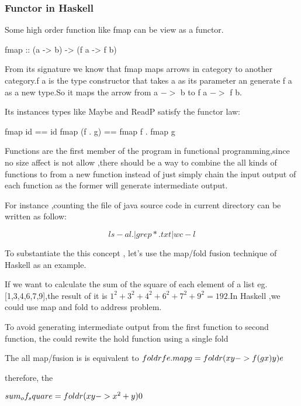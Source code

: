 \subsubsection*{Functor in Haskell}
Some high order function like fmap can be view as a functor.
\begin{hcode}
fmap :: (a -> b) -> (f a -> f b)
\end{hcode}
From its signature we know that fmap maps arrows in category to another category.f a is the type constructor that takes a as its parameter an generate f a as a new type.So it maps the arrow from a $->$ b to f a $->$ f b.

Its instances types like Maybe and ReadP satisfy the functor law:
\begin{hcode}
fmap id  ==  id
fmap (f . g)  ==  fmap f . fmap g
\end{hcode}

Functions are the first member of the program in functional programming,since no size affect is not allow ,there should be a way to combine the all kinds of functions to from a new function instead of just simply chain the input output of each function as the former will generate intermediate output.


For instance ,counting the file of java source code in current directory can be written as follow:


	$$ ls-al . | grep *.txt| wc -l $$ 
	
	
To substantiate the this concept , let's use the map/fold fusion technique of Haskell as an example.

If we want to calculate the sum of the square of each element of a list eg. [1,3,4,6,7,9],the result of it is  $ 1^2+3^2+4^2+6^2+7^2+9^2=192 $.In Haskell ,we could use map and fold to address problem.


To avoid generating intermediate output from the first function to second function, the could rewite the hold function using a single fold

The all map/fusion is is equivalent to 
$ foldr f e . map g = foldr (\\x y -> f (g x) y) e $

therefore, the 

$ sum_of_square = foldr (\\x y -> x^2 + y) 0 $





